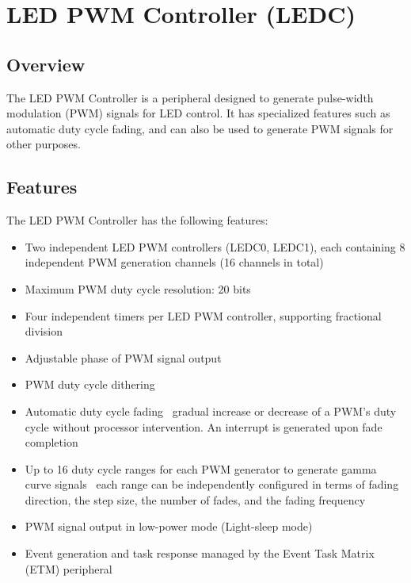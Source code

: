 \documentclass[main\_\_EN.tex]{subfiles}
\begin{document}
\setenglishformatting

\ifglobal
\else
    \clearpage
    \listoftodos
    \listofdonetodos
    \tableofcontents
\fi



\hypertarget{ledpwm}{}
\chapter{LED PWM Controller (LEDC)}
\label{mod:ledpwm}

\section{Overview}

The LED PWM Controller is a peripheral designed to generate pulse-width modulation (PWM) signals for LED control. It has specialized features such as automatic duty cycle fading, and can also be used to generate PWM signals for other purposes.

\section{Features}
The LED PWM Controller has the following features:
\begin{itemize}
    \item Two independent LED PWM controllers (LEDC0, LEDC1), each containing 8 independent PWM generation channels (16 channels in total)
    \item Maximum PWM duty cycle resolution: 20 bits
    \item Four independent timers per LED PWM controller, supporting fractional division
    \item Adjustable phase of PWM signal output
    \item PWM duty cycle dithering
    \item Automatic duty cycle fading \textendash\ gradual increase or decrease of a PWM's duty cycle without processor intervention. An interrupt is generated upon fade completion
    \item Up to 16 duty cycle ranges for each PWM generator to generate gamma curve signals \textendash\ each range can be independently configured in terms of fading direction, the step size, the number of fades, and the fading frequency
    \item PWM signal output in low-power mode (Light-sleep mode)
    \item Event generation and task response managed by the Event Task Matrix (ETM) peripheral
\end{itemize}
\end{document}
